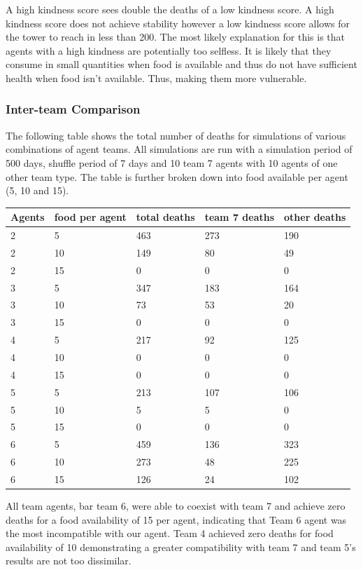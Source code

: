 A high kindness score sees double the deaths of a low kindness score. A high kindness score does not achieve stability however a low kindness score allows for the tower to reach in less than 200. The most likely explanation for this is that agents with a high kindness are potentially too selfless. It is likely that they consume in small quantities when food is available and thus do not have sufficient health when food isn't available. Thus, making them more vulnerable.

\newpage
\subsubsection{Inter-team Comparison}
The following table shows the total number of deaths for simulations of various combinations of agent teams. All simulations are run with a simulation period of 500 days, shuffle period of 7 days and 10 team 7 agents with 10 agents of one other team type. The table is further broken down into food available per agent (5, 10 and 15).
\begin{center}
\begin{tabular} { | m{5em} | m{5em} | m{5em} | m{5em} | m{5em} | }
  \hline
    \textbf{Agents} & \textbf{food per agent} & \textbf{total deaths} & \textbf{team 7 deaths} & \textbf{other deaths} \\
  \hline
    2 & 5 & 463 & 273 & 190 \\
  \hline
    2 & 10 & 149 & 80 & 49 \\
  \hline
    2 & 15 & 0 & 0 & 0 \\
  \hline
    3 & 5 & 347 & 183 & 164\\
  \hline
    3 & 10 & 73 & 53 & 20\\
  \hline
    3 & 15 & 0 & 0 & 0 \\
  \hline
    4 & 5 & 217 & 92 & 125\\
  \hline
    4 & 10 & 0 & 0 & 0 \\
  \hline
    4 & 15 & 0 & 0 & 0 \\
  \hline
    5 & 5 & 213 & 107 & 106 \\
  \hline
    5 & 10 & 5 & 5 & 0 \\
  \hline
    5 & 15 &  0 & 0 & 0 \\ 
  \hline
    6 & 5 & 459 & 136 & 323\\
  \hline
    6 & 10 & 273 & 48 & 225\\
  \hline
    6 & 15 & 126 & 24 & 102\\
  \hline
\end{tabular}
\end{center}
All team agents, bar team 6, were able to coexist with team 7 and achieve zero deaths for a food availability of 15 per agent, indicating that Team 6 agent was the most incompatible with our agent. Team 4 achieved zero deaths for food availability of 10 demonstrating a greater compatibility with team 7 and team 5's results are not too dissimilar.  

